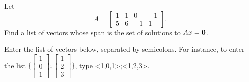 Let  \[A = \left[ \begin{array}{cccc} 1 & 1 & 0 & -1\\ 
5 & 6 & -1 & 1 \end{array} \right].\]  Find a list
of vectors whose span is the set of solutions to $Ax = \mathbf{0}$.  

Enter the list of vectors below, separated by semicolons.  For instance, 
to enter the list $\{\left[\begin{array}{c} 1 \\ 0 \\ 1
\end{array} \right]; \left[\begin{array}{c} 1 \\ 2 \\ 3
\end{array} \right] \}$, type <1,0,1>;<1,2,3>.  



